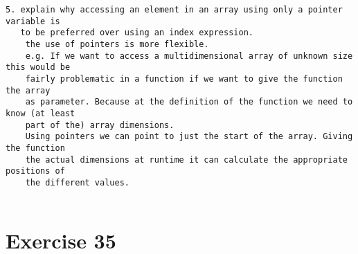 \documentclass{article}[9pt]
\begin{document}
\begin{verbatim}
5. explain why accessing an element in an array using only a pointer variable is 
   to be preferred over using an index expression.
    the use of pointers is more flexible. 
    e.g. If we want to access a multidimensional array of unknown size this would be
    fairly problematic in a function if we want to give the function the array
    as parameter. Because at the definition of the function we need to know (at least
    part of the) array dimensions. 
    Using pointers we can point to just the start of the array. Giving the function 
    the actual dimensions at runtime it can calculate the appropriate positions of 
    the different values.
    
\end{verbatim}

\section*{Exercise 35}
\end{document}
